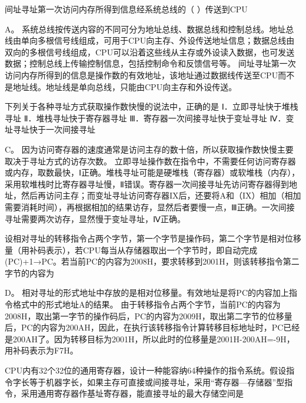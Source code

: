 \question 间址寻址第一次访问内存所得到信息经系统总线的（ ）传送到CPU
\par{}
\begin{solution}A。
系统总线按传送内容的不同可分为地址总线、数据总线和控制总线。地址总线由单向多根信号线组成，可用于CPU向主存、外设传送地址信息；数据总线由双向的多根信号线组成，CPU可以沿着这些线从主存或外设读入数据，也可发送数据；控制总线上传输控制信息，包括控制命令和反馈信号等。
间址寻址第一次访问内存所得到的信息是操作数的有效地址，该地址通过数据线传送至CPU而不是地址线。地址线是单向总线，只能由CPU向主存和外设传送。
\end{solution}
\question 下列关于各种寻址方式获取操作数快慢的说法中，正确的是
Ⅰ．立即寻址快于堆栈寻址 Ⅱ．堆栈寻址快于寄存器寻址
Ⅲ．寄存器一次间接寻址快于变址寻址 Ⅳ．变址寻址快于一次间接寻址
\par{}
\begin{solution}C。
因为访问寄存器的速度通常是访问主存的数十倍，所以获取操作数快慢主要取决于寻址方式的访存次数。
立即寻址操作数在指令中，不需要任何访问寄存器或内存，取数最快，Ⅰ正确。堆栈寻址可能是硬堆栈（寄存器）或软堆栈（内存），采用软堆栈时比寄存器寻址慢，Ⅱ错误。寄存器一次间接寻址先访问寄存器得到地址，然后再访问主存；而变址寻址访问寄存器IX后，还要将A和（IX）相加（相加需要消耗时间），再根据相加的结果访存，显然后者要慢一点，Ⅲ正确。一次间接寻址需要两次访存，显然慢于变址寻址，Ⅳ正确。
\end{solution}
\question 设相对寻址的转移指令占两个字节，第一个字节是操作码，第二个字节是相对位移量（用补码表示），若CPU每当从存储器取出一个字节时，即自动完成(PC)+1→PC。若当前PC的内容为2008H，要求转移到2001H，则该转移指令第二字节的内容为
\par{}
\begin{solution}D。
相对寻址的形式地址中存放的是相对位移量。有效地址是将PC的内容加上指令格式中的形式地址A的结果。
由于转移指令占两个字节，当前PC的内容为2008H，取出第一字节的操作码后，PC的内容为2009H，取出第二字节的位移量后，PC的内容为200AH，因此，在执行该转移指令计算转移目标地址时，PC已经是200AH了。因为转移目标为2001H，所以此时的位移量是2001H-200AH=-9H，用补码表示为F7H。
\end{solution}
\question CPU内有32个32位的通用寄存器，设计一种能容纳64种操作的指令系统。假设指令字长等于机器字长，如果主存可直接或间接寻址，采用``寄存器---存储器''型指令，采用通用寄存器作基址寄存器，能直接寻址的最大存储空间是
\par{}
